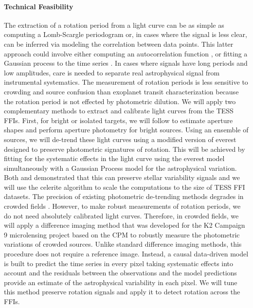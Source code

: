 \documentclass[letterpaper,12pt,preprint]{hack_aastex}
\newcommand{\Kepler}{{\it Kepler}}
\newcommand{\kepler}{\Kepler}
\newcommand{\TESS}{{\it TESS}}
\begin{document}

\paragraph{Technical Feasibility}
The extraction of a rotation period from a light curve can be as simple as
computing a Lomb-Scargle periodogram or, in cases where the signal is less
clear, can be inferred via modeling the correlation between data points.
This latter approach could involve either computing an autocorrelation
function \citep{mcquillan2013}, or fitting a Gaussian process to the time
series \citep{angus2017, foreman-mackey2017}.
In cases where signals have long periods and low amplitudes, care is needed to
separate real astrophysical signal from instrumental systematics.
The measurement of rotation periods is less sensitive to crowding and source
confusion than exoplanet transit characterization because the rotation period
is not effected by photometric dilution.
We will apply two complementary methods to extract and calibrate light curves
from the TESS FFIs.
First, for bright or isolated targets, we will follow \citet{montet2017} to
estimate aperture shapes and perform aperture photometry for bright sources.
Using an ensemble of sources, we will de-trend these light curves using a
modified version of \textsf{everest} \citep{luger2016, luger2017} designed to
preserve photometric signatures of rotation.
This will be achieved by fitting for the systematic effects in the light curve
using the \textsf{everest} model simultaneously with a Gaussian Process model
for the astrophysical variation.
Both \citet{aigrain2016} and \citet{luger2016} demonstrated that this can
preserve stellar variability signals and we will use the \textsf{celerite}
algorithm \citep{dfm2017} to scale the computations to the size of TESS FFI
datasets.
The precision of existing photometric de-trending methods degrades in crowded
fields \citep[for example,][]{luger2017}.
However, to make robust measurements of rotation periods, we do not need
absolutely calibrated light curves.
Therefore, in crowded fields, we will apply a difference imaging method that
was developed for the K2 Campaign 9 microlensing project \citep{henderson2016}
based on the \textsf{CPM} \citep{wang2016} to robustly measure the photometric
variations of crowded sources.
Unlike standard difference imaging methods, this procedure does not require a
reference image.
Instead, a causal data-driven model is built to predict the time series in
every pixel taking systematic effects into account and the residuals between
the observations and the model predictions provide an estimate of the
astrophysical variability in each pixel.
We will tune this method preserve rotation signals and apply it to detect
rotation across the FFIs.
\end{document}
